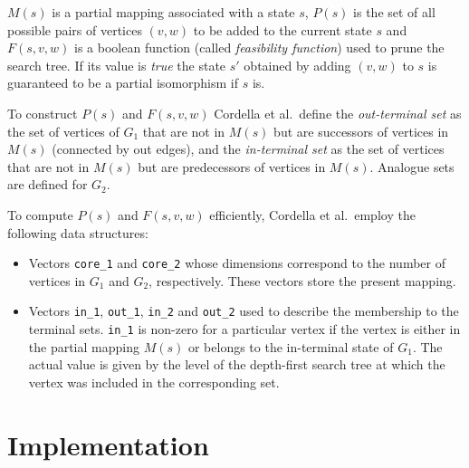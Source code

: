 \documentclass[12pt]{article}
\def\etal{{et al.\ }}
\begin{document}
$M(s)$ is a partial mapping associated with a state $s$, $P(s)$ is the set
of all possible pairs of vertices $(v,w)$ to be added to the current state $s$
and $F(s,v,w)$ is a boolean function (called {\em feasibility function}) used
to prune the search tree. If its value is {\em true} the state $s'$ obtained
by adding $(v,w)$ to $s$ is guaranteed to be a partial isomorphism if $s$ is. 


To construct $P(s)$ and $F(s,v,w)$ Cordella \etal define the 
{\em out-terminal set} as the set of vertices of $G_1$ that are not in $M(s)$
but are successors of vertices in $M(s)$ (connected by out edges), and the
{\em in-terminal set} as the set of vertices that are not in $M(s)$ but are
predecessors of vertices in $M(s)$. Analogue sets are defined for $G_2$.


To compute $P(s)$ and $F(s,v,w)$ efficiently, Cordella \etal employ the
following data structures:

\begin{itemize}

\item Vectors \verb+core_1+ and \verb+core_2+ whose dimensions correspond to
the number of vertices in $G_1$ and $G_2$, respectively. These vectors store the
present mapping.

\item Vectors \verb+in_1+, \verb+out_1+, \verb+in_2+ and \verb+out_2+ used to
describe the membership to the terminal sets. \verb+in_1+ is non-zero for a
particular vertex if the vertex is either in the partial mapping $M(s)$ or
belongs to the in-terminal state of $G_1$. The actual value is given by the
level of the depth-first search tree at which the vertex was included in the
corresponding set.

\end{itemize}


\section{Implementation}
\end{document}
